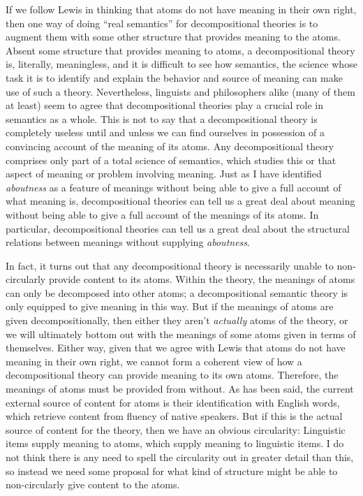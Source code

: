 \documentclass[12pt]{amsart}
\begin{document}
If we follow Lewis in thinking that atoms do not have meaning in their own right, then one way of doing ``real semantics'' for decompositional theories is to augment them with some other structure that provides meaning to the atoms. Absent some structure that provides meaning to atoms, a decompositional theory is, literally, meaningless, and it is difficult to see how semantics, the science whose task it is to identify and explain the behavior and source of meaning can make use of such a theory. Nevertheless, linguists and philosophers alike (many of them at least) seem to agree that decompositional theories play a crucial role in semantics as a whole. This is not to say that a decompositional theory is completely useless until and unless we can find ourselves in possession of a convincing account of the meaning of its atoms. Any decompositional theory comprises only part of a total science of semantics, which studies this or that aspect of meaning or problem involving meaning. Just as I have identified \emph{aboutness} as a feature of meanings without being able to give a full account of what meaning is, decompositional theories can tell us a great deal about meaning without being able to give a full account of the meanings of its atoms. In particular, decompositional theories can tell us a great deal about the structural relations between meanings without supplying \emph{aboutness}.

In fact, it turns out that any decompositional theory is necessarily unable to non-circularly provide content to its atoms. Within the theory, the meanings of atoms can only be decomposed into other atoms; a decompositional semantic theory is only equipped to give meaning in this way. But if the meanings of atoms are given decompositionally, then either they aren't \emph{actually} atoms of the theory, or we will ultimately bottom out with the meanings of some atoms given in terms of themselves. Either way, given that we agree with Lewis that atoms do not have meaning in their own right, we cannot form a coherent view of how a decompositional theory can provide meaning to its own atoms. Therefore, the meanings of atoms must be provided from without. As has been said, the current external source of content for atoms is their identification with English words, which retrieve content from fluency of native speakers. But if this is the actual source of content for the theory, then we have an obvious circularity: Linguistic items supply meaning to atoms, which supply meaning to linguistic items. I do not think there is any need to spell the circularity out in greater detail than this, so instead we need some proposal for what kind of structure might be able to non-circularly give content to the atoms.
\end{document}
